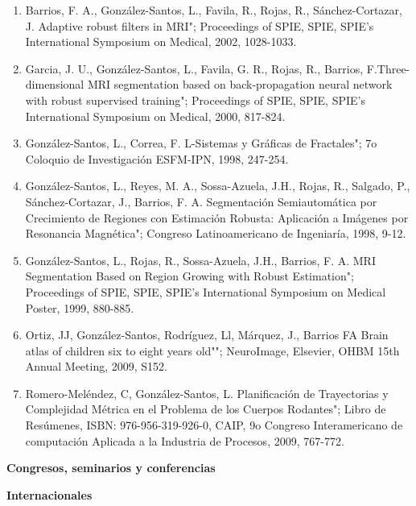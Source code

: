 \documentclass[12pt]{article}
\begin{document}
\begin{enumerate}
\item Barrios, F. A., González-Santos, L., Favila, R., Rojas, R., Sánchez-Cortazar, J. Adaptive robust filters in MRI"; Proceedings of 
SPIE, SPIE, SPIE's International Symposium on Medical, 2002, 1028-1033.

\item Garcia, J. U., González-Santos, L., Favila, G. R., Rojas, R., Barrios, F.Three-dimensional MRI segmentation based on back-propagation neural network with robust supervised training"; Proceedings of SPIE, 
SPIE, SPIE's International Symposium on Medical, 2000, 817-824.

\item González-Santos, L., Correa, F. L-Sistemas y Gráficas de Fractales"; 7o Coloquio de Investigación ESFM-IPN, 1998, 247-254.

\item González-Santos, L., Reyes, M. A., Sossa-Azuela, J.H., Rojas, R., Salgado, P., Sánchez-Cortazar, J., Barrios, F. A. Segmentación 
Semiautomática por Crecimiento de Regiones con Estimación Robusta: Aplicación a Imágenes por Resonancia Magnética"; 
Congreso Latinoamericano de Ingeniaría, 1998, 9-12.

\item González-Santos, L., Rojas, R., Sossa-Azuela, J.H., Barrios, F. A. MRI Segmentation Based on Region Growing with Robust 
Estimation"; Proceedings of SPIE, SPIE, SPIE's International Symposium on Medical 
Poster, 1999, 880-885.

\item Ortiz, JJ, González-Santos, Rodríguez, Ll, Márquez, J., Barrios FA Brain atlas of children six to eight years old""; NeuroImage, 
Elsevier, OHBM 15th Annual Meeting, 2009, S152.

\item Romero-Meléndez, C, González-Santos, L. Planificación de Trayectorias y Complejidad Métrica en el Problema de los Cuerpos 
Rodantes"; Libro de Resúmenes, ISBN: 
976-956-319-926-0, CAIP, 9o Congreso Interamericano de computación Aplicada a la Industria de Procesos, 2009, 767-772.
\end{enumerate}

\textbf{Congresos, seminarios y conferencias}

\hfill

\textbf{Internacionales}
\end{document}

